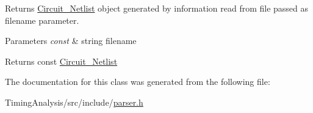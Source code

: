 Returns \hyperlink{classCircuit__Netlist}{Circuit\-\_\-\-Netlist} object generated by information read from file passed as filename parameter. 


\begin{DoxyParams}{Parameters}
{\em const} & string filename\\
\hline
\end{DoxyParams}
\begin{DoxyReturn}{Returns}
const \hyperlink{classCircuit__Netlist}{Circuit\-\_\-\-Netlist} 
\end{DoxyReturn}


The documentation for this class was generated from the following file\-:\begin{DoxyCompactItemize}
\item 
Timing\-Analysis/src/include/\hyperlink{parser_8h}{parser.\-h}\end{DoxyCompactItemize}
